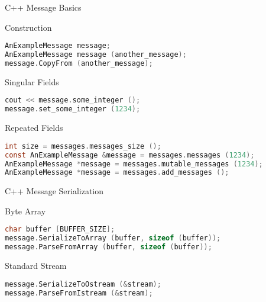 \begin{frame}[fragile]{C++ Message Basics}
    \begin{block}{Construction}
\begin{lstlisting}[language=c,style=mini]
AnExampleMessage message;
AnExampleMessage message (another_message);
message.CopyFrom (another_message);
\end{lstlisting}
    \end{block}
    \begin{block}{Singular Fields}
\begin{lstlisting}[language=c,style=mini]
cout << message.some_integer ();
message.set_some_integer (1234);
\end{lstlisting}
    \end{block}
    \begin{block}{Repeated Fields}
\begin{lstlisting}[language=c,style=mini]
int size = messages.messages_size ();
const AnExampleMessage &message = messages.messages (1234);
AnExampleMessage *message = messages.mutable_messages (1234);
AnExampleMessage *message = messages.add_messages ();
\end{lstlisting}
    \end{block}
\end{frame}


\begin{frame}[fragile]{C++ Message Serialization}
    \begin{block}{Byte Array}
\begin{lstlisting}[language=c,style=mini]
char buffer [BUFFER_SIZE];
message.SerializeToArray (buffer, sizeof (buffer));
message.ParseFromArray (buffer, sizeof (buffer));
\end{lstlisting}
    \end{block}

    \bigskip

    \begin{block}{Standard Stream}
\begin{lstlisting}[language=c,style=mini]
message.SerializeToOstream (&stream);
message.ParseFromIstream (&stream);
\end{lstlisting}
    \end{block}
\end{frame}


